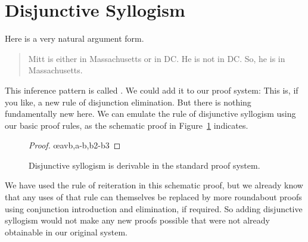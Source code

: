 \section{Disjunctive Syllogism}
Here is a very natural argument form.
	\begin{quote}
		Mitt is either in Massachusetts or in DC. He is not in DC. So, he is in Massachusetts.
	\end{quote}
This inference pattern is called . We could add it to our proof system:
This is, if you like, a new rule of disjunction elimination.
But there is nothing fundamentally new here. We can emulate the rule of disjunctive syllogism using our basic proof rules, as the schematic proof in Figure~\ref{fig.dsder} indicates. \begin{figure}
	\begin{proof}
	\have[\ ]{}{\vdots}
	\open
		\open
			\close
		\close
		\open
		\close
	\oe{avb,a-b,b2-b3}
\end{proof}
\caption{Disjunctive syllogism is derivable in the standard proof system.\label{fig.dsder}}
\end{figure}

We have used the rule of reiteration in this schematic proof, but we already know that any uses of that rule can themselves be replaced by more roundabout proofs using conjunction introduction and elimination, if required. So adding disjunctive syllogism would not make any new proofs possible that were not already obtainable in our original system.

